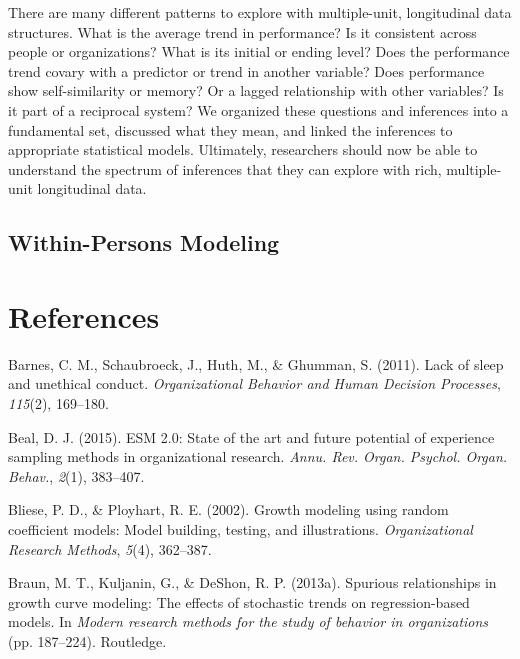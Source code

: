 \documentclass[english,,man]{apa6}
\begin{document}
There are many different patterns to explore with multiple-unit, longitudinal data structures. What is the average trend in performance? Is it consistent across people or organizations? What is its initial or ending level? Does the performance trend covary with a predictor or trend in another variable? Does performance show self-similarity or memory? Or a lagged relationship with other variables? Is it part of a reciprocal system? We organized these questions and inferences into a fundamental set, discussed what they mean, and linked the inferences to appropriate statistical models. Ultimately, researchers should now be able to understand the spectrum of inferences that they can explore with rich, multiple-unit longitudinal data.

\hypertarget{within-persons-modeling}{%
\subsection{Within-Persons Modeling}\label{within-persons-modeling}}

\newpage

\hypertarget{references}{%
\section{References}\label{references}}

\setlength{\parindent}{-0.5in}
\setlength{\leftskip}{0.5in}

\hypertarget{refs}{}
\leavevmode\hypertarget{ref-barnes_lack_2011}{}%
Barnes, C. M., Schaubroeck, J., Huth, M., \& Ghumman, S. (2011). Lack of sleep and unethical conduct. \emph{Organizational Behavior and Human Decision Processes}, \emph{115}(2), 169--180.

\leavevmode\hypertarget{ref-beal_esm_2015}{}%
Beal, D. J. (2015). ESM 2.0: State of the art and future potential of experience sampling methods in organizational research. \emph{Annu. Rev. Organ. Psychol. Organ. Behav.}, \emph{2}(1), 383--407.

\leavevmode\hypertarget{ref-bliese_growth_2002}{}%
Bliese, P. D., \& Ployhart, R. E. (2002). Growth modeling using random coefficient models: Model building, testing, and illustrations. \emph{Organizational Research Methods}, \emph{5}(4), 362--387.

\leavevmode\hypertarget{ref-braun2013spurious}{}%
Braun, M. T., Kuljanin, G., \& DeShon, R. P. (2013a). Spurious relationships in growth curve modeling: The effects of stochastic trends on regression-based models. In \emph{Modern research methods for the study of behavior in organizations} (pp. 187--224). Routledge.
\end{document}
